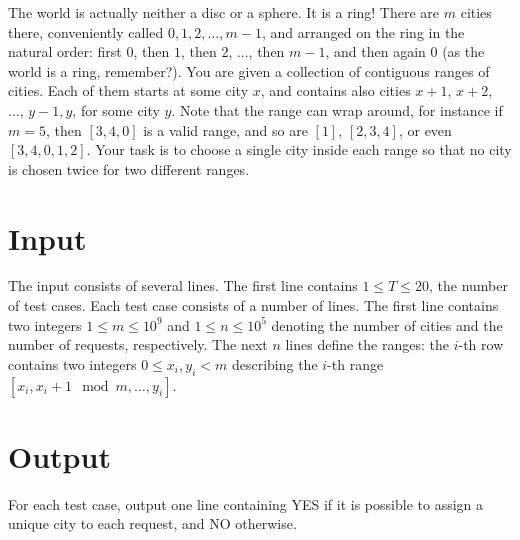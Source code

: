 
The world is actually neither a disc or a sphere. It is a ring! There are $m$ cities there, conveniently called $0,1,2,\ldots,m-1$, and arranged on the ring in the natural order:
first $0$, then $1$, then $2$, ..., then $m-1$, and then again $0$ (as the world is a ring, remember?). You are given a collection of contiguous ranges of cities. Each of them
starts at some city $x$, and contains also cities $x+1$, $x+2$, ..., $y-1,y$, for some city $y$. Note that the range can wrap around, for instance if $m=5$, then $[3,4,0]$ is a valid range,
and so are $[1]$, $[2,3,4]$, or even $[3,4,0,1,2]$. Your task is to choose a single city inside each range so that no city is chosen twice for two different ranges.

\section*{Input}
The input consists of several lines. The first line contains $1\le T\le 20$, the number of test cases.
Each test case consists of a number of lines. The first line contains two integers $1\le m\le 10^9$ and $1\leq n \le 10^5$ denoting the number of cities and the number of requests,
respectively.
The next $n$ lines define the ranges: the $i$-th row contains two integers $0\leq x_i, y_i < m$ describing the $i$-th range $[x_i,x_i+1 \mod m,\ldots,y_i]$.

\section*{Output}
For each test case, output one line containing YES if it is possible to assign a unique city to each request, and NO otherwise.

